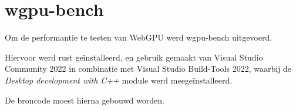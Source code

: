 


\section{wgpu-bench}

Om de performantie te testen van WebGPU werd wgpu-bench uitgevoerd.

Hiervoor werd rust geïnstalleerd, en gebruik gemaakt van Visual Studio Community 2022 in combinatie met Visual Studio Build-Tools 2022, waarbij de \textit{Desktop development with C++} module werd meegeïnstalleerd.

De broncode moest hierna gebouwd worden.

